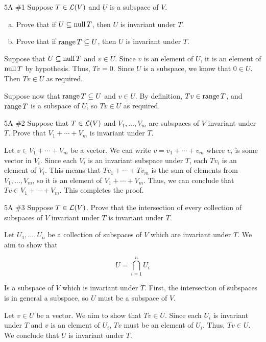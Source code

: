\documentclass[../main.tex]{subfiles}
\begin{document}
\begin{problem}{5A \#1}
  Suppose $T \in \mathcal{L}(V)$ and $U$ is a subspace of $V$.

  \begin{enumerate}[(a), noitemsep]
    \item Prove that if $U \subseteq \operatorname{null} T$, then $U$ is invariant under $T$.
    \item Prove that if $\operatorname{range} T \subseteq U$, then $U$ is invariant under $T$.
  \end{enumerate}
\end{problem}

\begin{solution}
  Suppose that $U \subseteq \operatorname{null} T$ and $v \in U$. Since $v$ is an element of
  $U$, it is an element of $\operatorname{null} T$ by hypothesis. Thus, $Tv = 0$. Since $U$
  is a subspace, we know that $0 \in U$. Then $Tv \in U$ as required.

  Suppose now that $\operatorname{range} T \subseteq U$ and $v \in U$. By definition, $Tv \in
  \operatorname{range} T$, and $\operatorname{range} T$ is a subspace of $U$, so $Tv \in U$ as required.
\end{solution}

\begin{problem}{5A \#2}
  Suppose that $T \in \mathcal{L}(V)$ and $V_1, \dots, V_m$ are subspaces of $V$
  invariant under $T$. Prove that $V_1 + \cdots + V_m$ is invariant under $T$.
\end{problem}

\begin{solution}
  Let $v \in V_1 + \cdots + V_m$ be a vector. We can write $v = v_1 + \cdots +
  v_m$ where $v_i$ is some vector in $V_i$. Since each $V_i$ is an invariant
  subspace under $T$, each $Tv_i$ is an element of $V_i$. This means that $Tv_1
  + \cdots + Tv_m$ is the sum of elements from $V_1, \dots, V_m$, so it is an
  element of $V_1 + \cdots + V_m$. Thus, we can conclude that $Tv \in V_1 +
  \cdots + V_m$. This completes the proof.
\end{solution}

\begin{problem}{5A \#3}
  Suppose $T \in \mathcal{L}(V)$. Prove that the intersection of every collection of
  subspaces of $V$ invariant under $T$ is invariant under $T$.
\end{problem}

\begin{solution}
  Let $U_1, \dots, U_n$ be a collection of subspaces of $V$ which are invariant
  under $T$. We aim to show that

  \[U = \bigcap_{i = 1}^n U_i\]

  Is a subspace of $V$ which is invariant under $T$. First, the intersection of
  subspaces is in general a subspace, so $U$ must be a subspace of $V$.

  Let $v \in U$ be a vector. We aim to show that $Tv \in U$. Since each $U_i$
  is invariant under $T$ and $v$ is an element of $U_i$, $Tv$ must be an
  element of $U_i$. Thus, $Tv \in U$. We conclude that $U$ is invariant under
  $T$.
\end{solution}
\end{document}
